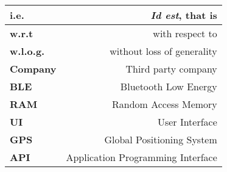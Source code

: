 \renewcommand{\arraystretch}{1.5}
\begin{center}
    \begin{tabular}{|l|r|}
        \hline
        \textbf{i.e.} & \textit{Id est}, that is  \\
        \hline
        \textbf{w.r.t} & with respect to  \\
        \hline
        \textbf{w.l.o.g.} & without loss of generality \\
        \hline
        \textbf{Company} & Third party company \\
        \hline
        \textbf{BLE} & Bluetooth Low Energy \\
        \hline
        \textbf{RAM} & Random Access Memory \\
        \hline
        \textbf{UI} & User Interface \\
        \hline
        \textbf{GPS} & Global Positioning System \\
        \hline
        \textbf{API} & Application Programming Interface \\
        \hline
    \end{tabular}
\end{center}